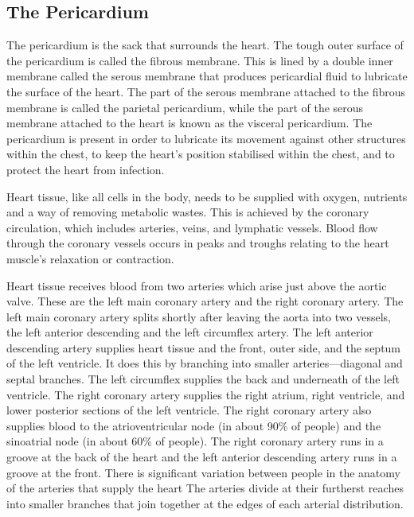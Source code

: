 \hypertarget{the-pericardium}{%
\subsection{The Pericardium}\label{the-pericardium}}

The pericardium is the sack that surrounds the heart. The tough outer surface of the pericardium is called the fibrous membrane. This is lined by a double inner membrane called the serous membrane that produces pericardial fluid to lubricate the surface of the heart. The part of the serous membrane attached to the fibrous membrane is called the parietal pericardium, while the part of the serous membrane attached to the heart is known as the visceral pericardium. The pericardium is present in order to lubricate its movement against other structures within the chest, to keep the heart's position stabilised within the chest, and to protect the heart from infection.

Heart tissue, like all cells in the body, needs to be supplied with oxygen, nutrients and a way of removing metabolic wastes. This is achieved by the coronary circulation, which includes arteries, veins, and lymphatic vessels. Blood flow through the coronary vessels occurs in peaks and troughs relating to the heart muscle's relaxation or contraction.

Heart tissue receives blood from two arteries which arise just above the aortic valve. These are the left main coronary artery and the right coronary artery. The left main coronary artery splits shortly after leaving the aorta into two vessels, the left anterior descending and the left circumflex artery. The left anterior descending artery supplies heart tissue and the front, outer side, and the septum of the left ventricle. It does this by branching into smaller arteries---diagonal and septal branches. The left circumflex supplies the back and underneath of the left ventricle. The right coronary artery supplies the right atrium, right ventricle, and lower posterior sections of the left ventricle. The right coronary artery also supplies blood to the atrioventricular node (in about 90\% of people) and the sinoatrial node (in about 60\% of people). The right coronary artery runs in a groove at the back of the heart and the left anterior descending artery runs in a groove at the front. There is significant variation between people in the anatomy of the arteries that supply the heart The arteries divide at their furtherst reaches into smaller branches that join together at the edges of each arterial distribution.



